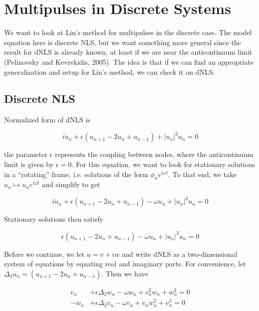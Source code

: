 \documentclass[12pt]{article}
\begin{document}
\section{Multipulses in Discrete Systems}

We want to look at Lin's method for multipulses in the discrete case. The model equation here is discrete NLS, but we want something more general since the result for dNLS is already known, at least if we are near the anticontinuum limit (Pelinovsky and Kevrekidis, 2005). The idea is that if we can find an appropriate generalization and setup for Lin's method, we can check it on dNLS.\\

\subsection{Discrete NLS}

Normalized form of dNLS is

\begin{equation}
i\dot{u}_n + \epsilon(u_{n+1} - 2 u_n + u_{n-1}) + |u_n|^2 u_n = 0
\end{equation}

the parameter $\epsilon$ represents the coupling between nodes, where the anticontinuum limit is given by $\epsilon = 0$. For this equation, we want to look for stationary solutions in a ``rotating'' frame, i.e. solutions of the form $\phi_n e^{i \omega t}$. To that end, we take $u_n \mapsto u_n e^{i \omega t}$ and simplify to get

\begin{equation}
i\dot{u}_n + \epsilon(u_{n+1} - 2 u_n + u_{n-1}) - \omega u_n + |u_n|^2 u_n = 0
\end{equation}

Stationary solutions then satisfy

\begin{equation}
\epsilon(u_{n+1} - 2 u_n + u_{n-1}) - \omega u_n + |u_n|^2 u_n = 0
\end{equation}

Before we continue, we let $u = v + i w$ and write dNLS as a two-dimensional system of equations by equating real and imaginary parts. For convenience, let $\Delta_2 u_n = (u_{n+1} - 2 u_n + u_{n-1})$. Then we have

\begin{align*}
\dot{v}_n &+ \epsilon \Delta_2 w_n - \omega w_n + v_n^2 w_n + w_n^3 = 0 \\
-\dot{w}_n &+ \epsilon \Delta_2 v_n - \omega v_n + v_n w_n^2 + v_n^3 = 0 \\
\end{align*}
\end{document}
